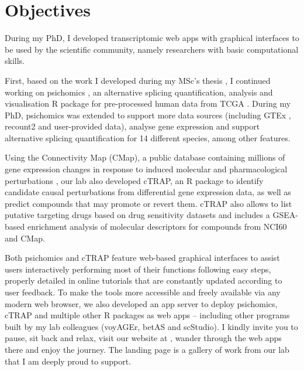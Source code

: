 \chapter{Objectives}

During my PhD, I developed transcriptomic web apps with graphical interfaces to be used by the scientific community, namely researchers with basic computational skills.

First, based on the work I developed during my MSc's thesis \cite{saraiva-agostinho:2016vw}, I continued working on psichomics \cite{saraiva-agostinho:2018uq,saraiva-agostinho:2020wz}, an alternative splicing quantification, analysis and visualisation R package for pre-processed human data from TCGA \cite{chang:2013ww}. During my PhD, psichomics was extended to support more data sources (including GTEx \cite{lonsdale:2013uo}, recount2 \cite{collado-torres:2017uw} and user-provided data), analyse gene expression and support alternative splicing quantification for 14 different species, among other features.

Using the Connectivity Map (CMap), a public database containing millions of gene expression changes in response to induced molecular and pharmacological perturbations \cite{subramanian:2017ul}, our lab also developed cTRAP, an R package to identify candidate causal perturbations from differential gene expression data, as well as predict compounds that may promote or revert them. cTRAP also allows to list putative targeting drugs based on drug sensitivity datasets and includes a GSEA-based enrichment analysis of molecular descriptors for compounds from NCI60 and CMap.

Both psichomics and cTRAP feature web-based graphical interfaces to assist users interactively performing most of their functions following easy steps, properly detailed in online tutorials that are constantly updated according to user feedback. To make the tools more accessible and freely available via any modern web browser, we also developed an app server to deploy psichomics, cTRAP and multiple other R packages as web apps -- including other programs built by my lab colleagues (voyAGEr, betAS and scStudio). I kindly invite you to pause, sit back and relax, visit our website at , wander through the web apps there and enjoy the journey. The landing page is a gallery of work from our lab that I am deeply proud to support.

